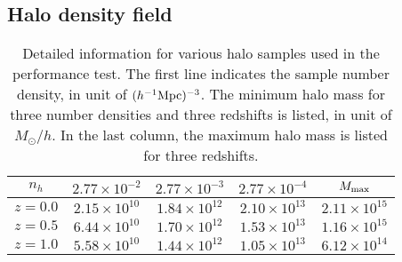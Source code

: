 \documentclass[iop]{emulateapj}
\newcommand{\mpch}{h^{-1} {\rm Mpc}}
\newcommand{\Msun}{M_{\odot}}
\begin{document}
{\subsection{Halo density field}
\label{sec:massassign}

\begin{table}
\begin{tabular}{c|c|c|c||c}
\hline\hline
$n_h$ & $2.77\times 10^{-2}$ & $2.77\times 10^{-3}$ & $2.77\times 10^{-4}$ & $M_{\rm max}$\\
\hline
$z=0.0$    & $2.15\times 10^{10}$ & $1.84\times 10^{12}$ & $2.10\times 10^{13}$ & $2.11\times 10^{15}$\\ 
$z=0.5$ & $6.44\times 10^{10}$ & $1.70\times 10^{12}$ & $1.53\times 10^{13}$ & $1.16\times 10^{15}$\\  
$z=1.0$    & $5.58\times 10^{10}$ & $1.44\times 10^{12}$ & $1.05\times 10^{13}$ & $6.12\times 10^{14}$\\     
\hline\hline
\end{tabular}
\caption{Detailed information for various halo samples used in the performance test.
The first line indicates the sample number density, in unit of $(\mpch)^{-3}$.
The minimum halo mass for three number densities and  three redshifts is listed, in unit of $\Msun/h$.
In the last column, the maximum halo mass is listed for three redshifts.}
\label{tab:haloinfo}
\end{table}



}
\end{document}
